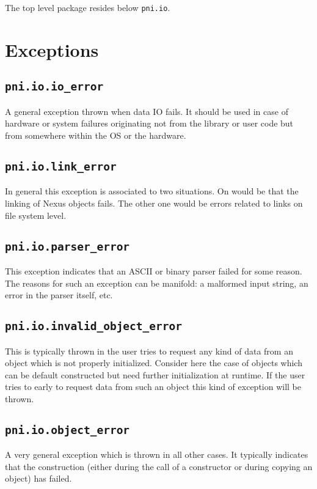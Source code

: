 
The top level package resides below {\tt pni.io}. 

\section{Exceptions}

\subsection{{\tt pni.io.io\_error}}

A general exception thrown when data IO fails. It should be used in case of
hardware or system failures originating not from the library or user code but
from somewhere within the OS or the hardware.

\subsection{{\tt pni.io.link\_error}}

In general this exception is associated to two situations. On would be that
the linking of Nexus objects fails. The other one would be errors related to
links on file system level.

\subsection{{\tt pni.io.parser\_error}}

This exception indicates that an ASCII or binary parser failed for some reason.
The reasons for such an exception can be manifold: a malformed  input string, an
error in the parser itself, etc. 

\subsection{{\tt pni.io.invalid\_object\_error}}

This is typically thrown in the user tries to request any kind of data from an
object which is not properly initialized. Consider here the case of objects
which can be default constructed but need further initialization at runtime. 
If the user tries to early to request data from such an object this kind of
exception will be thrown. 

\subsection{{\tt pni.io.object\_error}}

A very general exception which is thrown in all other cases. It typically
indicates that the construction (either during the call of a constructor or
during copying an object) has failed.

